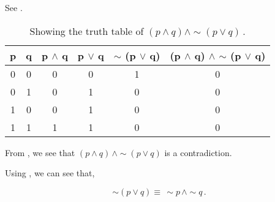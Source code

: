 %
%

\begin{subquestions}


\subquestion

See .

\begin{table}[ht]
	\centering
	\begin{tabular}{|c|c|c|c|c|c|}
		\hline
		p & q & p $\land$ q & p $\lor$ q & $\sim$ (p $\lor$ q) & (p $\land$ q) $\land$ $\sim$ (p $\lor$ q) \\
		\hline
		0 & 0 & 0 & 0 & 1 & 0 \\
		0 & 1 & 0 & 1 & 0 & 0 \\
		1 & 0 & 0 & 1 & 0 & 0 \\
		1 & 1 & 1 & 1 & 0 & 0 \\
		\hline
	\end{tabular}
	\caption{\label{2013:q1:tab:TruthTab1} Showing the truth table of $(p \land q) \land \sim (p \lor q)$\,.}
\end{table}


\subquestion

From , we see that $(p \land q)\, \land \sim (p \lor q)$ is a contradiction.


\subquestion

Using , we can see that,

\begin{equation}
	\sim (p \lor q) \equiv \, \sim p \, \land \sim q \,.
\end{equation}


\end{subquestions}
